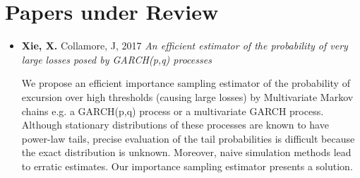 \documentclass[a4paper]{twentysecondcv} %
\begin{document}
\pagebreak
\makeprofile %

\section{Papers under Review}
\begin{itemize}
\item {\bf Xie, X.} Collamore, J, 2017
  {\it An efficient estimator of the probability of very large losses posed by
    GARCH(p,q) processes}

  {\small
    We propose an efficient importance sampling estimator of the
    probability of excursion over high thresholds (causing large
    losses) by Multivariate Markov chains e.g. a GARCH(p,q) process or
    a multivariate GARCH process.
    Although stationary distributions of these processes are known
    to have power-law tails, precise evaluation of the tail
    probabilities is difficult because the exact distribution is
    unknown. Moreover, naive simulation methods lead to erratic
    estimates. Our importance sampling estimator presents a solution.
  }
\end{itemize}






\end{document}
